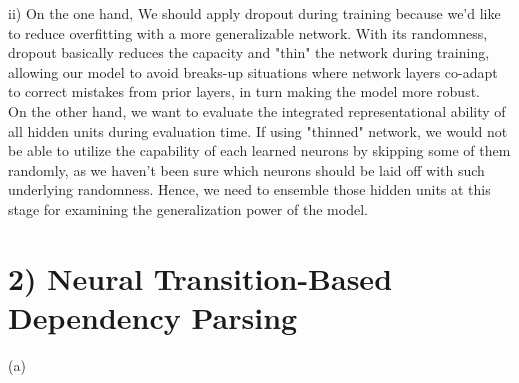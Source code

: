 \documentclass{article}
\begin{document}
\begin{enumerate}[label=\alph*)]
ii) On the one hand, We should apply dropout during training because we'd like to reduce overfitting with a more generalizable network. With its  randomness, dropout basically reduces the capacity and "thin" the network during training, allowing our model to avoid breaks-up situations where network layers co-adapt to correct mistakes from prior layers, in turn making the model more robust. \\
On the other hand, we want to evaluate the integrated representational ability of all hidden units during evaluation time. If using "thinned" network, we would not be able to utilize the capability of each learned neurons by skipping some of them randomly, as we haven't been sure which neurons should be laid off with such underlying randomness. Hence, we need to ensemble those hidden units at this stage for examining the generalization power of the model. 

\end{enumerate}
\newpage
\section*{2) Neural Transition-Based Dependency Parsing }
(a)
\end{document}
